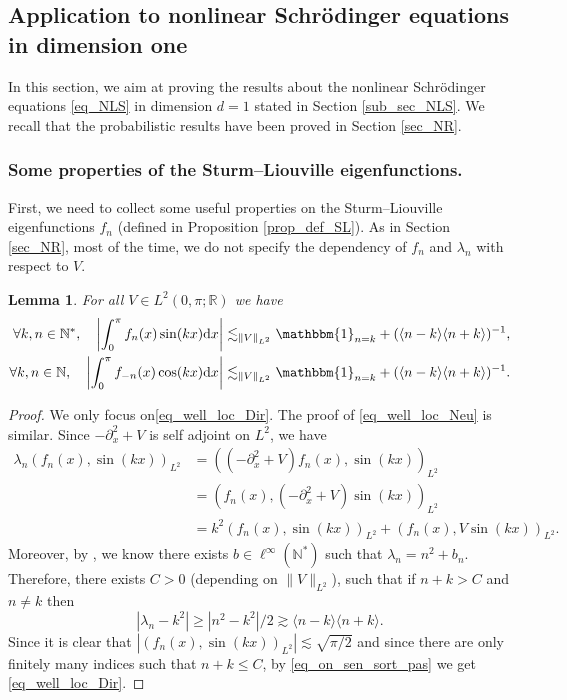 \documentclass[JEP,XML,SOM,Unicode,NoEqCountersInSection,published]{cedram}
\newtheorem{lemma}[theorem]{Lemma}
\theoremstyle{definition}
\begin{document}
\subsection{Application to nonlinear Schrödinger equations in dimension one}
\label{sec_NLS}
In this section, we aim at proving the results about the nonlinear Schrödinger equations \eqref{eq_NLS} in dimension $d=1$ stated in Section \ref{sub_sec_NLS}. We recall that the probabilistic results have been proved in Section \ref{sec_NR}.

\subsubsection{Some properties of the Sturm--Liouville eigenfunctions.}
First, we need to collect some useful properties on the Sturm--Liouville eigenfunctions $f_n$ (defined in Proposition \ref{prop_def_SL}). As in Section \ref{sec_NR}, most of the time, we do not specify the dependency of $f_n$ and $\lambda_n$ with respect to $V$.
\begin{lemma} \label{lem_well_loc} For all $V\in L^2(0,\pi;\mathbb{R})$ we have
\begin{align}
\label{eq_well_loc_Dir}
\forall k,n \in \mathbb{N}^*, \quad \biggl| \int_0^\pi f_n(x) \sin(k x) \mathrm{d}x \biggr| \lesssim_{\|V\|_{L^2}} \mathbbm{1}_{n=k} + (\langle n - k \rangle \langle n + k \rangle)^{-1},
\\
\label{eq_well_loc_Neu}
\forall k,n \in \mathbb{N}, \quad \biggl| \int_0^\pi f_{-n}(x) \cos(k x) \mathrm{d}x \biggr| \lesssim_{\|V\|_{L^2}} \mathbbm{1}_{n=k} + (\langle n - k \rangle \langle n + k \rangle)^{-1}.
\end{align}
\end{lemma}
\begin{proof} We only focus on\eqref{eq_well_loc_Dir}. The proof of \eqref{eq_well_loc_Neu} is similar. Since $-\partial_x^2 + V$ is self adjoint on $L^2$, we have
\begin{equation}
\label{eq_on_sen_sort_pas}
\begin{split}
\lambda_n (f_n(x),\sin(k x))_{L^2} &= ((-\partial_x^2 + V) f_n(x),\sin(k x))_{L^2}\\
& = (f_n(x),(-\partial_x^2 + V) \sin(k x))_{L^2} \\
&= k^2 (f_n(x),\sin(k x))_{L^2} + (f_n(x),V \sin(k x))_{L^2}.
\end{split}
\end{equation}
Moreover, by \cite[Th.\,4 p.\,35]{PT}, we know there exists $b \in \ell^{\infty}(\mathbb{N}^*)$ such that
$\lambda_n = n^2 + b_n$.
Therefore, there exists $C>0$ (depending on $\|V\|_{L^2}$), such that if $n+k>C$ and $n\neq k$ then
\[
|\lambda_n - k^2| \geq |n^2 - k^2|/2 \gtrsim \langle n - k \rangle \langle n + k \rangle.
\]
Since it is clear that $|(f_n(x),\sin(k x))_{L^2} |\lesssim \sqrt{\pi/2}$ and since there are only finitely many indices such that $n+k\leq C$, by \eqref{eq_on_sen_sort_pas} we get \eqref{eq_well_loc_Dir}.
\end{proof}
\end{document}
